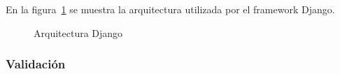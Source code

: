 \begin{itemize}
		En la figura~\ref{fig:django} se muestra la arquitectura utilizada por el framework Django.
		
		\begin{figure}[htbp!]
			\begin{center}
				\caption{Arquitectura Django}
				\label{fig:django}
			\end{center}
		\end{figure}
		
	\end{itemize}
	
		
	\subsubsection{Validación}
	
